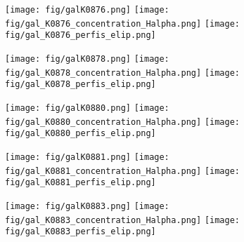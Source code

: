 \begin{figure}[!ht]
\begin{center}
\setcaptionmargin{1cm}
\texttt{[image: fig/galK0876.png]}
\texttt{[image: fig/gal\_K0876\_concentration\_Halpha.png]}
\texttt{[image: fig/gal\_K0876\_perfis\_elip.png]}
\end{center}
\end{figure}


\begin{figure}[!ht]
\begin{center}
\setcaptionmargin{1cm}
\texttt{[image: fig/galK0878.png]}
\texttt{[image: fig/gal\_K0878\_concentration\_Halpha.png]}
\texttt{[image: fig/gal\_K0878\_perfis\_elip.png]}
\end{center}
\end{figure}


\begin{figure}[!ht]
\begin{center}
\setcaptionmargin{1cm}
\texttt{[image: fig/galK0880.png]}
\texttt{[image: fig/gal\_K0880\_concentration\_Halpha.png]}
\texttt{[image: fig/gal\_K0880\_perfis\_elip.png]}
\end{center}
\end{figure}


\begin{figure}[!ht]
\begin{center}
\setcaptionmargin{1cm}
\texttt{[image: fig/galK0881.png]}
\texttt{[image: fig/gal\_K0881\_concentration\_Halpha.png]}
\texttt{[image: fig/gal\_K0881\_perfis\_elip.png]}
\end{center}
\end{figure}


\begin{figure}[!ht]
\begin{center}
\setcaptionmargin{1cm}
\texttt{[image: fig/galK0883.png]}
\texttt{[image: fig/gal\_K0883\_concentration\_Halpha.png]}
\texttt{[image: fig/gal\_K0883\_perfis\_elip.png]}
\end{center}
\end{figure}


